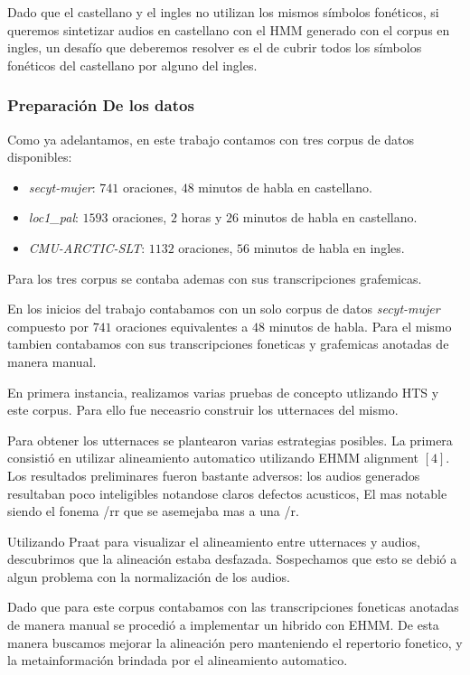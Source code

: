 Dado que el castellano y el ingles no utilizan los mismos símbolos fonéticos, si queremos sintetizar audios en castellano con el HMM generado con el corpus en ingles, un desafío que deberemos resolver es el de cubrir todos los símbolos fonéticos del castellano por alguno del ingles.

\subsubsection{Preparación De los datos}

Como ya adelantamos, en este trabajo contamos con tres corpus de datos disponibles:

\begin{itemize}
\item \textit{secyt-mujer}: $741$ oraciones, $48$ minutos de habla en castellano.
\item \textit{loc1\_pal}: $1593$ oraciones, $2$ horas y $26$ minutos de habla en castellano.
\item \textit{CMU-ARCTIC-SLT}: $1132$ oraciones, $56$ minutos de habla en ingles.
\end{itemize}

Para los tres corpus se contaba ademas con sus transcripciones grafemicas. 

En los inicios del trabajo contabamos con un solo corpus de datos \textit{secyt-mujer} compuesto por $741$ oraciones equivalentes a $48$ minutos de habla. Para el mismo tambien contabamos con sus transcripciones foneticas y grafemicas anotadas de manera manual.

En primera instancia, realizamos varias pruebas de concepto utlizando HTS y este corpus. Para ello fue neceasrio construir los utternaces del mismo.  

Para obtener los utternaces se plantearon varias estrategias posibles. La primera consistió en utilizar alineamiento automatico utilizando EHMM alignment $[4]$. Los resultados preliminares fueron bastante adversos: los audios generados resultaban poco inteligibles notandose claros defectos acusticos, El mas notable siendo el fonema /rr que se asemejaba mas a una /r.

Utilizando Praat para visualizar el alineamiento entre utternaces y audios, descubrimos que la alineación estaba desfazada. Sospechamos que esto se debió a algun problema con la normalización de los audios.

Dado que para este corpus contabamos con las transcripciones foneticas anotadas de manera manual se procedió a implementar un hibrido con EHMM. De esta manera buscamos mejorar la alineación pero manteniendo el repertorio fonetico, y la metainformación brindada por el alineamiento automatico.

